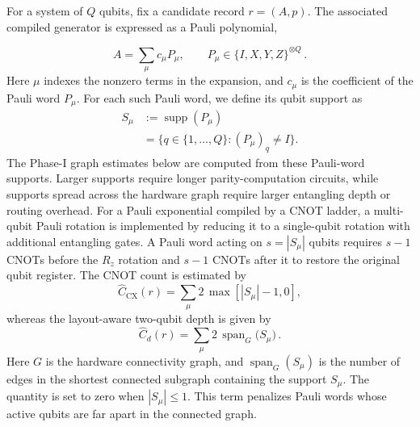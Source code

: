\documentclass[
  reprint,
  amsmath,
  amssymb,
  aps,
  pra,
  nofootinbib,
  superscriptaddress,
  floatfix
]{revtex4-2}
\begin{document}
For a system of \(Q\) qubits, fix a candidate record \(r=(A,p)\). The associated compiled generator is expressed as a Pauli polynomial,

\begin{equation}
A=\sum_{\mu}c_{\mu}P_{\mu}, \qquad P_{\mu}\in\{I,X,Y,Z\}^{\otimes Q}\,.
\label{eq:pauli_expansion}
\end{equation}
%
Here \(\mu\) indexes the nonzero terms in the expansion, and \(c_\mu\) is the
coefficient of the Pauli word \(P_\mu\).
For each such Pauli word, we define its qubit support as
%
\begin{equation}
\begin{aligned}
S_{\mu}
&:=\operatorname{supp}(P_{\mu}) \\
&=\{q\in\{1,\ldots,Q\}:(P_{\mu})_q\ne I\}.
\end{aligned}
\label{eq:pauli_word_support}
\end{equation}
%
The Phase-I graph estimates below are computed from these Pauli-word supports. Larger supports require longer parity-computation circuits, while supports spread across the hardware graph require larger entangling depth or routing overhead. For a Pauli exponential compiled by a CNOT ladder, a multi-qubit Pauli rotation is implemented by reducing it to a single-qubit rotation with additional entangling gates. A Pauli word acting on \(s=|S_{\mu}|\) qubits requires \(s-1\) \textsc{CNOT}s before the \(R_z\) rotation and \(s-1\) \textsc{CNOT}s after it to restore the original qubit register. The CNOT count is estimated by
%
\begin{equation*}
\widehat C_{\mathrm{CX}}(r)=\sum_{\mu}2\,\max[|S_{\mu}|-1, 0],
\end{equation*}
whereas the layout-aware two-qubit depth is given by
\begin{equation*}
\widehat C_d(r)=\sum_{\mu}2\,\operatorname{span}_{G}
\bigl(S_{\mu}\bigr)\,.
\end{equation*}
Here \(G\) is the hardware connectivity graph, and $\operatorname{span}_{G}(S_{\mu})$ is the number of edges in the shortest connected subgraph containing the support \(S_{\mu}\). The quantity is set to zero when $|S_{\mu}|\le1$. This term penalizes Pauli words whose active qubits are far apart in the connected graph.
\end{document}
